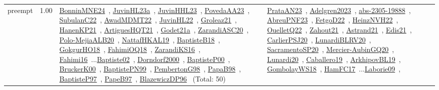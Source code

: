 {\begin{longtable}{p{3cm}r>{\raggedright\arraybackslash}p{6cm}>{\raggedright\arraybackslash}p{6cm}>{\raggedright\arraybackslash}p{8cm}}
\index{preempt}\index{Concepts!preempt}preempt &  1.00 & \href{../works/BonninMNE24.pdf}{BonninMNE24}~\cite{BonninMNE24}, \href{../works/JuvinHL23a.pdf}{JuvinHL23a}~\cite{JuvinHL23a}, \href{../works/JuvinHHL23.pdf}{JuvinHHL23}~\cite{JuvinHHL23}, \href{../works/PovedaAA23.pdf}{PovedaAA23}~\cite{PovedaAA23}, \href{../works/SubulanC22.pdf}{SubulanC22}~\cite{SubulanC22}, \href{../works/AwadMDMT22.pdf}{AwadMDMT22}~\cite{AwadMDMT22}, \href{../works/JuvinHL22.pdf}{JuvinHL22}~\cite{JuvinHL22}, \href{../works/Groleaz21.pdf}{Groleaz21}~\cite{Groleaz21}, \href{../works/HanenKP21.pdf}{HanenKP21}~\cite{HanenKP21}, \href{../works/ArtiguesHQT21.pdf}{ArtiguesHQT21}~\cite{ArtiguesHQT21}, \href{../works/Godet21a.pdf}{Godet21a}~\cite{Godet21a}, \href{../works/ZarandiASC20.pdf}{ZarandiASC20}~\cite{ZarandiASC20}, \href{../works/Polo-MejiaALB20.pdf}{Polo-MejiaALB20}~\cite{Polo-MejiaALB20}, \href{../works/NattafHKAL19.pdf}{NattafHKAL19}~\cite{NattafHKAL19}, \href{../works/BaptisteB18.pdf}{BaptisteB18}~\cite{BaptisteB18}, \href{../works/GokgurHO18.pdf}{GokgurHO18}~\cite{GokgurHO18}, \href{../works/FahimiOQ18.pdf}{FahimiOQ18}~\cite{FahimiOQ18}, \href{../works/ZarandiKS16.pdf}{ZarandiKS16}~\cite{ZarandiKS16}, \href{../works/Fahimi16.pdf}{Fahimi16}~\cite{Fahimi16}...\href{../works/Baptiste02.pdf}{Baptiste02}~\cite{Baptiste02}, \href{../works/Dorndorf2000.pdf}{Dorndorf2000}~\cite{Dorndorf2000}, \href{../works/BaptisteP00.pdf}{BaptisteP00}~\cite{BaptisteP00}, \href{../works/BruckerK00.pdf}{BruckerK00}~\cite{BruckerK00}, \href{../works/BaptistePN99.pdf}{BaptistePN99}~\cite{BaptistePN99}, \href{../works/PembertonG98.pdf}{PembertonG98}~\cite{PembertonG98}, \href{../works/PapaB98.pdf}{PapaB98}~\cite{PapaB98}, \href{../works/BaptisteP97.pdf}{BaptisteP97}~\cite{BaptisteP97}, \href{../works/PapeB97.pdf}{PapeB97}~\cite{PapeB97}, \href{../works/BlazewiczDP96.pdf}{BlazewiczDP96}~\cite{BlazewiczDP96} (Total: 50) & \href{../works/PrataAN23.pdf}{PrataAN23}~\cite{PrataAN23}, \href{../works/Adelgren2023.pdf}{Adelgren2023}~\cite{Adelgren2023}, \href{../works/abs-2305-19888.pdf}{abs-2305-19888}~\cite{abs-2305-19888}, \href{../works/AbreuPNF23.pdf}{AbreuPNF23}~\cite{AbreuPNF23}, \href{../works/FetgoD22.pdf}{FetgoD22}~\cite{FetgoD22}, \href{../works/HeinzNVH22.pdf}{HeinzNVH22}~\cite{HeinzNVH22}, \href{../works/OuelletQ22.pdf}{OuelletQ22}~\cite{OuelletQ22}, \href{../works/Zahout21.pdf}{Zahout21}~\cite{Zahout21}, \href{../works/Astrand21.pdf}{Astrand21}~\cite{Astrand21}, \href{../works/Edis21.pdf}{Edis21}~\cite{Edis21}, \href{../works/CarlierPSJ20.pdf}{CarlierPSJ20}~\cite{CarlierPSJ20}, \href{../works/LunardiBLRV20.pdf}{LunardiBLRV20}~\cite{LunardiBLRV20}, \href{../works/SacramentoSP20.pdf}{SacramentoSP20}~\cite{SacramentoSP20}, \href{../works/Mercier-AubinGQ20.pdf}{Mercier-AubinGQ20}~\cite{Mercier-AubinGQ20}, \href{../works/Lunardi20.pdf}{Lunardi20}~\cite{Lunardi20}, \href{../works/Caballero19.pdf}{Caballero19}~\cite{Caballero19}, \href{../works/ArkhipovBL19.pdf}{ArkhipovBL19}~\cite{ArkhipovBL19}, \href{../works/GombolayWS18.pdf}{GombolayWS18}~\cite{GombolayWS18}, \href{../works/HamFC17.pdf}{HamFC17}~\cite{HamFC17}...\href{../works/Laborie09.pdf}{Laborie09}~\cite{Laborie09}, 
\end{longtable}}

